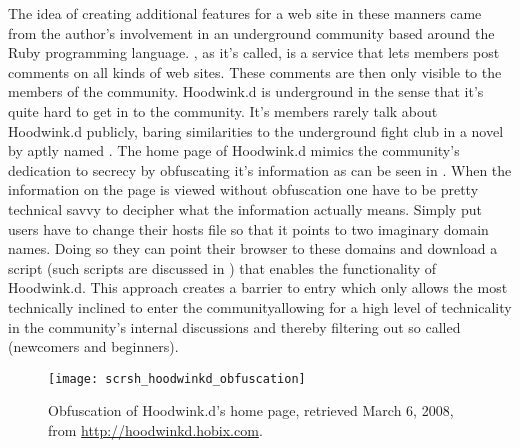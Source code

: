 The idea of creating additional features for a web site in these manners
came from the author's involvement in an underground community based around
the Ruby%
programming language. %
,
as it's called, is a service that lets members post comments on all kinds of
web sites. These comments are then only visible to the members of the
community.
Hoodwink.d is underground in the sense that it's quite hard to get in to
the community. It's members rarely talk about Hoodwink.d publicly, baring
similarities to the underground fight club in a novel by \citet{palahniuk96}
aptly named %
.
The home page of Hoodwink.d mimics the community's dedication to secrecy
by obfuscating it's information as can be seen in
.
When the information on the page is viewed without obfuscation%
one have to be pretty technical savvy to decipher what the information 
actually means. Simply put users have to change their hosts file
so that it points to two imaginary domain names. Doing so they can point their
browser to these domains and download a script (such scripts are discussed in
)
that enables the functionality
of Hoodwink.d.%
This approach creates a barrier to entry which only allows the most
technically inclined to enter the community\dash{}allowing for a
high level of technicality in the community's internal discussions
and thereby filtering out so called 
(newcomers and beginners).

\begin{figure}
  \centering
  \texttt{[image: scrsh\_hoodwinkd\_obfuscation]}
  \caption[Hoodwink.d Obfuscation]{
    Obfuscation of Hoodwink.d's home page,
    retrieved March 6, 2008, from
    \url{http://hoodwinkd.hobix.com}.
  }
  \label{figure:scrsh.hoodwinkd.obfuscation}
\end{figure}

